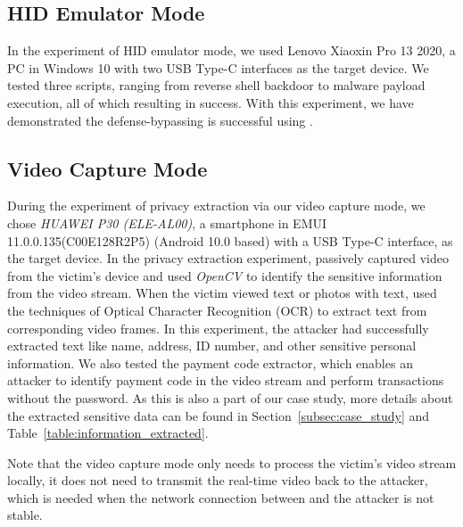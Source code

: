 \subsection{HID Emulator Mode}

In the experiment of HID emulator mode, we used {Lenovo Xiaoxin Pro 13
2020}, a PC in Windows 10 with two USB Type-C interfaces as the
target device.  We tested three scripts, ranging from
reverse shell backdoor to malware payload execution, all of which resulting in
success. With this experiment, we have demonstrated the defense-bypassing is successful
using \tool.


\subsection{Video Capture Mode}

During the experiment of privacy extraction via our video capture mode, we chose \textit{HUAWEI P30 (ELE-AL00)}, a
smartphone in EMUI 11.0.0.135(C00E128R2P5) (Android 10.0 based) with a USB Type-C interface, as the
target device.  In the privacy extraction experiment, \tool passively captured video
from the victim's device and used \textit{OpenCV} to identify the sensitive
information from the video stream.  When the victim viewed text or photos with
text, \tool used the techniques of Optical Character Recognition (OCR)  to
extract text from corresponding video frames. In this experiment, the attacker had
successfully extracted text like name, address, ID number, and other sensitive
personal information. We also tested the payment code extractor, which enables
an attacker to identify payment code in the video stream and perform transactions
without the password. As this is also a part of our case study, more details about
the extracted sensitive data can be found in Section~\ref{subsec:case_study} and
Table~\ref{table:information_extracted}.

Note that the video capture mode only needs to
process the victim's video stream locally, it does not need to transmit the real-time video back to the attacker, which is needed when the network connection between \tool and the attacker is not stable.

